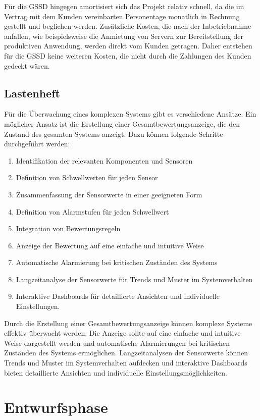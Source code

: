 \begin{flushleft}
Für die \acs{GSSD} hingegen amortisiert sich das Projekt relativ schnell, da die im Vertrag mit dem Kunden vereinbarten Personentage monatlich in Rechnung gestellt und beglichen werden. Zusätzliche Kosten, die nach der Inbetriebnahme anfallen, wie beispielsweise die Anmietung von Servern zur Bereitstellung der produktiven Anwendung, werden direkt vom Kunden getragen. Daher entstehen für die \acs{GSSD} keine weiteren Kosten, die nicht durch die Zahlungen des Kunden gedeckt wären.
\subsection{Lastenheft}
Für die Überwachung eines komplexen Systems gibt es verschiedene Ansätze. Ein möglicher Ansatz ist die Erstellung einer Gesamtbewertungsanzeige, die den Zustand des gesamten Systems anzeigt. Dazu können folgende Schritte durchgeführt werden:

\begin{enumerate}
\item Identifikation der relevanten Komponenten und Sensoren
\item Definition von Schwellwerten für jeden Sensor
\item Zusammenfassung der Sensorwerte in einer geeigneten Form
\item Definition von Alarmstufen für jeden Schwellwert
\item Integration von Bewertungsregeln
\item Anzeige der Bewertung auf eine einfache und intuitive Weise
\item Automatische Alarmierung bei kritischen Zuständen des Systems
\item Langzeitanalyse der Sensorwerte für Trends und Muster im Systemverhalten
\item Interaktive Dashboards für detaillierte Ansichten und individuelle Einstellungen.
\end{enumerate}

Durch die Erstellung einer Gesamtbewertungsanzeige können komplexe Systeme effektiv überwacht werden.
Die Anzeige sollte auf eine einfache und intuitive Weise dargestellt werden und automatische Alarmierungen
bei kritischen Zuständen des Systems ermöglichen.
Langzeitanalysen der Sensorwerte können Trends und Muster im Systemverhalten
aufdecken und interaktive Dashboards bieten detaillierte Ansichten und individuelle Einstellungsmöglichkeiten.


\section{Entwurfsphase}


\end{flushleft}
